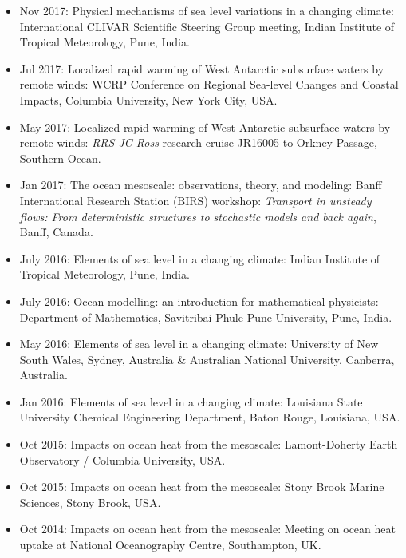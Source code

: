 \documentclass{article}
\begin{document}
\begin{itemize}[leftmargin=*]
\item Nov 2017: {\sc Physical mechanisms of sea level variations in a changing climate}: International CLIVAR Scientific Steering Group meeting, Indian Institute of Tropical Meteorology, Pune, India.


\item Jul 2017: {\sc Localized rapid warming of West Antarctic
    subsurface waters by remote winds}: WCRP Conference on Regional
  Sea-level Changes and Coastal Impacts, Columbia University, New York City, USA. 

\item May 2017: {\sc Localized rapid warming of West Antarctic
    subsurface waters by remote winds}: {\it RRS JC Ross} research cruise
  JR16005 to Orkney Passage, Southern Ocean.

\item Jan 2017: {\sc The ocean mesoscale: observations, theory, and
    modeling}: Banff International Research Station (BIRS) workshop:
  {\it Transport in unsteady flows: From deterministic structures to
    stochastic models and back again}, Banff, Canada.

\item July 2016: {\sc Elements of sea level in a changing climate}:
  Indian Institute of Tropical Meteorology, Pune, India.

\item July 2016: {\sc Ocean modelling: an introduction for
    mathematical physicists}: Department of Mathematics, Savitribai
  Phule Pune University, Pune, India.

\item May 2016: {\sc Elements of sea level in a changing climate}:
  University of New South Wales, Sydney, Australia \& Australian
  National University, Canberra, Australia.

\item Jan 2016: {\sc Elements of sea level in a changing climate}:
  Louisiana State University Chemical Engineering Department, Baton
  Rouge, Louisiana, USA.

\item Oct 2015: {\sc Impacts on ocean heat from the mesoscale}:
  Lamont-Doherty Earth Observatory / Columbia University, USA.

\item Oct 2015: {\sc Impacts on ocean heat from the mesoscale}: Stony
  Brook Marine Sciences, Stony Brook, USA.

\item Oct 2014: {\sc Impacts on ocean heat from the mesoscale}:
  Meeting on ocean heat uptake at National Oceanography Centre,
  Southampton, UK.


\end{itemize}
\end{document}

